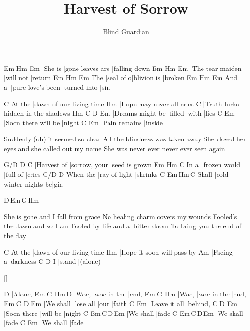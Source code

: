 \documentclass{song}
\title{Harvest of Sorrow}
\author{Blind Guardian}
\begin{document}
\begin{multicols}{2}

\strophe
Em\7    Hm               Em\7     
|She is |gone leaves are |falling down
Em\7             Hm        Em\7
|The tear maiden |will not |return
    Em\7      Hm          Em\7
The |seal of o|blivion is |broken
      Em\7              Hm           Em\7
And a~|pure love's been |turned into |sin
\endstrophe

\strophe
       C
At the |dawn of our living time
Hm
|Hope may cover all cries
C
|Truth lurks hidden in the shadows
Hm               C       D     Em
|Dreams might be |filled |with |lies
C                   Em
|Soon there will be |night
C             Em
|Pain remains |inside
\endstrophe

\strophe*
Suddenly (oh) it seemed so clear
All the blindness was taken away
She closed her eyes and she called out my name
She was never ever never ever seen again
\endstrophe

G/D         D             C
|Harvest of |sorrow, your |seed is grown
     Em            Hm       C
In a~|frozen world |full of |cries
         G/D           D
When the |ray of light |shrinks
      C                     Em\,Hm\,C
Shall |cold winter nights be|gin
\endstrophe

\strophe
D\,Em\,G\,Hm
|
\endstrophe

\columnbreak

\strophe*
She is gone and I fall from grace
No healing charm covers my wounds
Fooled's the dawn and so I am
Fooled by life and a~bitter doom
To bring you the end of the day
\endstrophe

\strophe
       C
At the |dawn of our living time
Hm
|Hope it soon will pass by
Am
|Facing a~darkness
  C      D
I |stand |(alone)
\endstrophe

\ref{}

\strophe
D
|Alone,
Em    G           Hm\,D
|Woe, |woe in the |end,
Em    G           Hm
|Woe, |woe in the |end,
Em        C         D    Em
|We shall |lose all |our |faith
C             Em
|Leave it all |behind,
C           D        Em
|Soon there |will be |night
C         Em\,C\,D\,Em
|We shall |fade
C         Em\,C\,D\,Em
|We shall |fade
C         Em
|We shall |fade
\endstrophe

\end{multicols}
\end{document}

